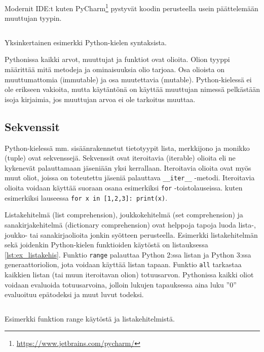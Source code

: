 \documentclass[finnish]{tktltiki2}
\theoremstyle{definition}
\theoremstyle{remark}
\begin{document}
Modernit IDE:t kuten PyCharm\footnote{\url{https://www.jetbrains.com/pycharm/}} pystyvät koodin perusteella usein päättelemään muuttujan tyypin.

\begin{listing}
    \inputminted[linenos]{python}{code/foo.py}
    \caption{Yksinkertainen esimerkki Python-kielen syntaksista.}
    \label{lst:ex1}
\end{listing}

Pythonissa kaikki arvot, muuttujat ja funktiot ovat olioita. Olion tyyppi määrittää mitä metodeja ja ominaisuuksia olio tarjoaa. Osa olioista on muuttumattomia (immutable) ja osa muutettavia (mutable). Python-kielessä ei ole erikseen vakioita, mutta käytäntönä on käyttää muuttujan nimessä pelkästään isoja kirjaimia, jos muuttujan arvoa ei ole tarkoitus muuttaa.



\subsection{Sekvenssit}

Python-kielessä mm. sisäänrakennetut tietotyypit lista, merkkijono ja monikko (tuple) ovat sekvenssejä. Sekvenssit ovat iteroitavia (iterable) olioita eli ne kykenevät palauttamaan jäseniään yksi kerrallaan. Iteroitavia olioita ovat myös muut oliot, joissa on toteutettu jäseniä palauttava \verb|__iter__| -metodi. Iteroitavia olioita voidaan käyttää suoraan osana esimerkiksi \verb|for| -toistolauseissa. kuten esimerkiksi lauseessa \verb|for x in [1,2,3]: print(x)|.

Listakehitelmä (list comprehension), joukkokehitelmä (set comprehension) ja sanakirjakehitelmä (dictionary comprehension) ovat helppoja tapoja luoda lista-, joukko- tai sanakirjaolioita jonkin syötteen perusteella. Esimerkki listakehitelmän sekä joidenkin Python-kielen funktioiden käytöstä on listauksessa \ref{lst:ex_listakehis}. Funktio \verb|range| palauttaa Python 2:ssa listan ja Python 3:ssa generaattoriolion, jota voidaan käyttää listan tapaan. Funktio \verb|all| tarkastaa kaikkien listan (tai muun iteroitavan olion) totuusarvon. Pythonissa kaikki oliot voidaan evaluoida totuusarvoina, jolloin lukujen tapauksessa aina luku ''0'' evaluoituu epätodeksi ja muut luvut todeksi.


\begin{listing}
    \inputminted[linenos]{python}{code/luvut.py}
    \caption{Esimerkki funktion range käytöstä ja listakehitelmistä.}
    \label{lst:ex_listakehis}
\end{listing}
\end{document}
